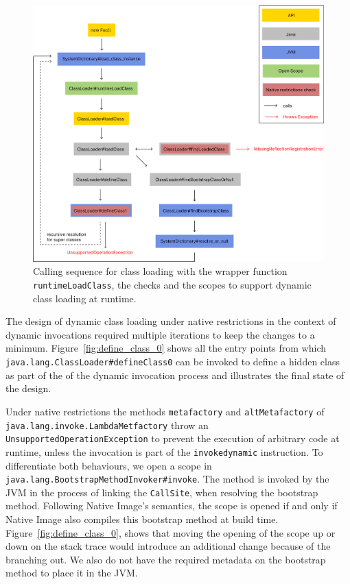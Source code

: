 
\begin{figure}
    \centering
    \includegraphics[scale=0.5]{resources/Group 412.png}
    \caption{Calling sequence for class loading with the wrapper function \texttt{runtimeLoadClass}, the checks and the scopes to support dynamic class loading at runtime.}
    \label{fig:load_class}
\end{figure}

The design of dynamic class loading under native restrictions in the context of dynamic invocations required multiple iterations to keep the changes to a minimum. Figure~\ref{fig:define_class_0} shows all the entry points from which \verb|java.lang.ClassLoader#defineClass0| can be invoked to define a hidden class as part of the of the dynamic invocation process and illustrates the final state of the design. 

Under native restrictions the methods \verb|metafactory| and \verb|altMetafactory| of \verb|java.lang.invoke.LambdaMetfactory| throw an \verb|UnsupportedOperationException| to prevent the execution of arbitrary code at runtime, unless the invocation is part of the \verb|invokedynamic| instruction.
To differentiate both behaviours, we open a scope in \verb|java.lang.BootstrapMethodInvoker#invoke|. The method is invoked by the JVM in the process of linking the \verb|CallSite|, when resolving the bootstrap method. Following Native Image's semantics, the scope is opened if and only if Native Image also compiles this bootstrap method at build time. Figure~\ref{fig:define_class_0}, shows that moving the opening of the scope up or down on the stack trace would introduce an additional change because of the branching out. We also do not have the required metadata on the bootstrap method to place it in the JVM.

